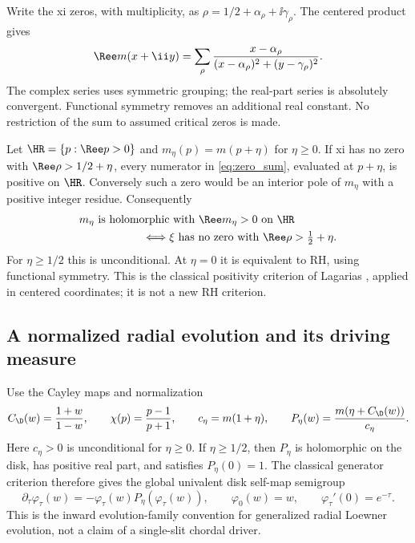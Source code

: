 Write the xi zeros, with multiplicity, as
$\rho=1/2+\alpha_\rho+\ii\gamma_\rho$. The centered product gives
\begin{equation}
 \Ree m(x+\ii y)=\sum_\rho
 \frac{x-\alpha_\rho}{(x-\alpha_\rho)^2+(y-\gamma_\rho)^2}.
 \label{eq:zero_sum}
\end{equation}
The complex series uses symmetric grouping; the real-part series is
absolutely convergent. Functional symmetry removes an additional real
constant. No restriction of the sum to assumed critical zeros is made.

Let $\HR=\{p:\Ree p>0\}$ and $m_\eta(p)=m(p+\eta)$ for $\eta\ge0$.
If xi has no zero with $\Ree\rho>1/2+\eta$, every numerator in
\eqref{eq:zero_sum}, evaluated at $p+\eta$, is positive on $\HR$.
Conversely such a zero would be an interior pole of $m_\eta$ with a
positive integer residue. Consequently
\begin{equation}
 \begin{split}
 &m_\eta\text{ is holomorphic with }\Ree m_\eta>0\text{ on }\HR\\
 &\hspace{2cm}\Longleftrightarrow
 \xi\text{ has no zero with }\Ree\rho>\tfrac12+\eta.
 \end{split}
 \label{eq:positive_real_criterion}
\end{equation}
For $\eta\ge1/2$ this is unconditional. At $\eta=0$ it is equivalent
to RH, using functional symmetry. This is the classical positivity
criterion of Lagarias \cite{Lagarias,LagariasCorrection}, applied in
centered coordinates; it is not a new RH criterion.

\subsection{A normalized radial evolution and its driving measure}

Use the Cayley maps and normalization
\begin{equation}
 C_\D(w)=\frac{1+w}{1-w},\qquad \chi(p)=\frac{p-1}{p+1},\qquad
 c_\eta=m(1+\eta),\qquad
 P_\eta(w)=\frac{m(\eta+C_\D(w))}{c_\eta}.
 \label{eq:radial_source}
\end{equation}
Here $c_\eta>0$ is unconditional for $\eta\ge0$. If $\eta\ge1/2$,
then $P_\eta$ is holomorphic on the disk, has positive real part, and
satisfies $P_\eta(0)=1$. The classical generator criterion
\cite{BCDM} therefore gives the global univalent disk self-map semigroup
\begin{equation}
 \partial_\tau\varphi_\tau(w)
 =-\varphi_\tau(w)P_\eta(\varphi_\tau(w)),\qquad
 \varphi_0(w)=w,\qquad \varphi_\tau'(0)=e^{-\tau}.
 \label{eq:radial_flow}
\end{equation}
This is the inward evolution-family convention for generalized radial
Loewner evolution, not a claim of a single-slit chordal driver.

